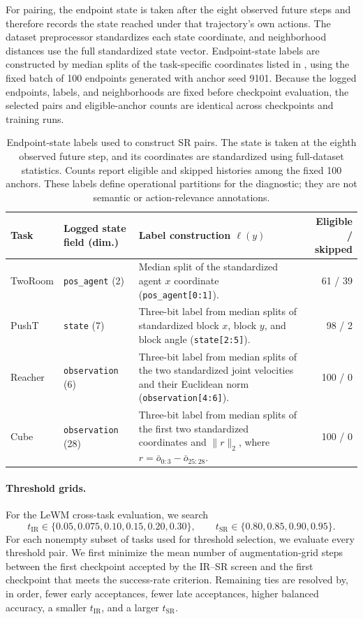 \documentclass[10pt]{article}
\newcommand{\code}[1]{\texttt{#1}}
\begin{document}
For pairing, the endpoint state is taken after the eight observed future steps
and therefore records the state reached under that trajectory's own actions.
The dataset preprocessor standardizes each state coordinate, and neighborhood
distances use the full standardized state vector. Endpoint-state labels are
constructed by median splits of the task-specific coordinates listed in
, using the fixed batch of 100 endpoints generated with
anchor seed 9101. Because the logged endpoints, labels, and neighborhoods are
fixed before checkpoint evaluation, the selected pairs and eligible-anchor
counts are identical across checkpoints and training runs.

\begin{table}[H]
\centering
\caption{Endpoint-state labels used to construct SR pairs. The state is taken
at the eighth observed future step, and its coordinates are standardized using
full-dataset statistics. Counts report eligible and skipped histories among
the fixed 100 anchors. These labels define operational partitions for the
diagnostic; they are not semantic or action-relevance annotations.}
\label{tab:sr-labels}
\footnotesize
\setlength{\tabcolsep}{3pt}
\begin{tabularx}{\linewidth}{l l X r}
\toprule
Task & Logged state field (dim.) & Label construction $\ell(y)$ & Eligible / skipped \\
\midrule
TwoRoom & \code{pos\_agent} (2) & Median split of the standardized agent $x$ coordinate (\code{pos\_agent[0:1]}). & 61 / 39 \\
PushT & \code{state} (7) & Three-bit label from median splits of standardized block $x$, block $y$, and block angle (\code{state[2:5]}). & 98 / 2 \\
Reacher & \code{observation} (6) & Three-bit label from median splits of the two standardized joint velocities and their Euclidean norm (\code{observation[4:6]}). & 100 / 0 \\
Cube & \code{observation} (28) & Three-bit label from median splits of the first two standardized coordinates and $\|r\|_2$, where $r=\bar o_{0:3}-\bar o_{25:28}$. & 100 / 0 \\
\bottomrule
\end{tabularx}
\end{table}

\paragraph{Threshold grids.}
For the LeWM cross-task evaluation, we search
\[
t_{\mathrm{IR}}\in\{0.05,0.075,0.10,0.15,0.20,0.30\},
\qquad
t_{\mathrm{SR}}\in\{0.80,0.85,0.90,0.95\}.
\]
For each nonempty subset of tasks used for threshold selection, we evaluate
every threshold pair. We first minimize the mean number of augmentation-grid
steps between the first checkpoint accepted by the IR--SR screen and the
first checkpoint that meets the success-rate criterion. Remaining ties are
resolved by, in order, fewer early acceptances, fewer late acceptances, higher
balanced accuracy, a smaller $t_{\mathrm{IR}}$, and a larger
$t_{\mathrm{SR}}$.
\end{document}
